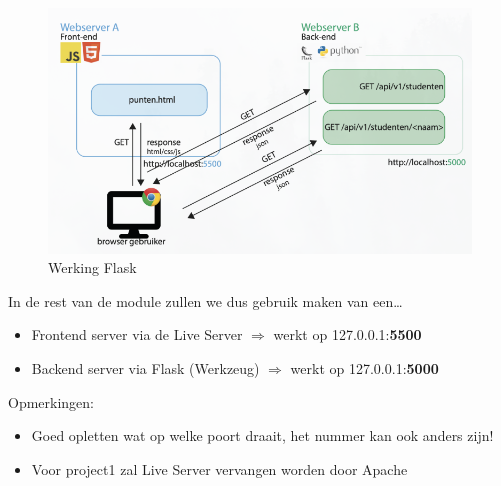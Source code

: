 \documentclass{article}
\newcommand{\bold}[1]{\textbf{#1}}
\begin{document}
\begin{figure}[H]
    \centering
    \includegraphics[width=\textwidth]{img/Screenshot_20200302_105005.png}
    \caption{Werking Flask}
\end{figure}

In de rest van de module zullen we dus gebruik maken van een\dots
\begin{itemize}
    \item Frontend server via de Live Server $\Rightarrow$ werkt op 127.0.0.1:\bold{5500}
    \item Backend server via Flask (Werkzeug) $\Rightarrow$ werkt op 127.0.0.1:\bold{5000}
\end{itemize}

Opmerkingen:
\begin{itemize}
    \item Goed opletten wat op welke poort draait, het nummer kan ook anders zijn!
    \item Voor project1 zal Live Server vervangen worden door Apache
\end{itemize}
\end{document}
